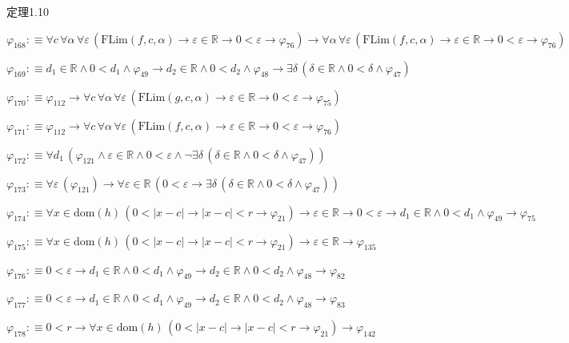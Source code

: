 \begin{fullproof}{定理1.10}
\begin{abbrevlist}
\item $\varphi_{168} :\equiv \forall c\,\forall \alpha\,\forall \varepsilon\,(\mathrm{FLim}(f,c,\alpha) \to \varepsilon \in \mathbb{R} \to 0 < \varepsilon \to \varphi_{76}) \to \forall \alpha\,\forall \varepsilon\,(\mathrm{FLim}(f,c,\alpha) \to \varepsilon \in \mathbb{R} \to 0 < \varepsilon \to \varphi_{76})$
\item $\varphi_{169} :\equiv d_{1} \in \mathbb{R} \land 0 < d_{1} \land \varphi_{49} \to d_{2} \in \mathbb{R} \land 0 < d_{2} \land \varphi_{48} \to \exists \delta\,(\delta \in \mathbb{R} \land 0 < \delta \land \varphi_{47})$
\item $\varphi_{170} :\equiv \varphi_{112} \to \forall c\,\forall \alpha\,\forall \varepsilon\,(\mathrm{FLim}(g,c,\alpha) \to \varepsilon \in \mathbb{R} \to 0 < \varepsilon \to \varphi_{75})$
\item $\varphi_{171} :\equiv \varphi_{112} \to \forall c\,\forall \alpha\,\forall \varepsilon\,(\mathrm{FLim}(f,c,\alpha) \to \varepsilon \in \mathbb{R} \to 0 < \varepsilon \to \varphi_{76})$
\item $\varphi_{172} :\equiv \forall d_{1}\,(\varphi_{121} \land \varepsilon \in \mathbb{R} \land 0 < \varepsilon \land \neg \exists \delta\,(\delta \in \mathbb{R} \land 0 < \delta \land \varphi_{47}))$
\item $\varphi_{173} :\equiv \forall \varepsilon\,(\varphi_{121}) \to \forall \varepsilon \in \mathbb{R}\,(0 < \varepsilon \to \exists \delta\,(\delta \in \mathbb{R} \land 0 < \delta \land \varphi_{47}))$
\item $\varphi_{174} :\equiv \forall x \in \mathrm{dom}(h)\,(0 < \lvert x - c \rvert \to \lvert x - c \rvert < r \to \varphi_{21}) \to \varepsilon \in \mathbb{R} \to 0 < \varepsilon \to d_{1} \in \mathbb{R} \land 0 < d_{1} \land \varphi_{49} \to \varphi_{75}$
\item $\varphi_{175} :\equiv \forall x \in \mathrm{dom}(h)\,(0 < \lvert x - c \rvert \to \lvert x - c \rvert < r \to \varphi_{21}) \to \varepsilon \in \mathbb{R} \to \varphi_{135}$
\item $\varphi_{176} :\equiv 0 < \varepsilon \to d_{1} \in \mathbb{R} \land 0 < d_{1} \land \varphi_{49} \to d_{2} \in \mathbb{R} \land 0 < d_{2} \land \varphi_{48} \to \varphi_{82}$
\item $\varphi_{177} :\equiv 0 < \varepsilon \to d_{1} \in \mathbb{R} \land 0 < d_{1} \land \varphi_{49} \to d_{2} \in \mathbb{R} \land 0 < d_{2} \land \varphi_{48} \to \varphi_{83}$
\item $\varphi_{178} :\equiv 0 < r \to \forall x \in \mathrm{dom}(h)\,(0 < \lvert x - c \rvert \to \lvert x - c \rvert < r \to \varphi_{21}) \to \varphi_{142}$

\end{abbrevlist}
\end{fullproof}
